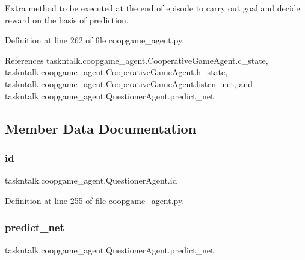 \begin{DoxyVerb}Extra method to be executed at the end of episode to carry out goal
and decide reward on the basis of prediction.
\end{DoxyVerb}
 

Definition at line 262 of file coopgame\+\_\+agent.\+py.



References taskntalk.\+coopgame\+\_\+agent.\+Cooperative\+Game\+Agent.\+c\+\_\+state, taskntalk.\+coopgame\+\_\+agent.\+Cooperative\+Game\+Agent.\+h\+\_\+state, taskntalk.\+coopgame\+\_\+agent.\+Cooperative\+Game\+Agent.\+listen\+\_\+net, and taskntalk.\+coopgame\+\_\+agent.\+Questioner\+Agent.\+predict\+\_\+net.



\subsection{Member Data Documentation}
\mbox{\label{classtaskntalk_1_1coopgame__agent_1_1QuestionerAgent_abc7eacb9c5c02bb00c838d72aef7cf54}} 
\subsubsection{\texorpdfstring{id}{id}}
{\footnotesize\ttfamily taskntalk.\+coopgame\+\_\+agent.\+Questioner\+Agent.\+id}



Definition at line 255 of file coopgame\+\_\+agent.\+py.

\mbox{\label{classtaskntalk_1_1coopgame__agent_1_1QuestionerAgent_a6ee5fbf93467c4069cadb42626de6c5d}} 
\subsubsection{\texorpdfstring{predict\+\_\+net}{predict\_net}}
{\footnotesize\ttfamily taskntalk.\+coopgame\+\_\+agent.\+Questioner\+Agent.\+predict\+\_\+net}




